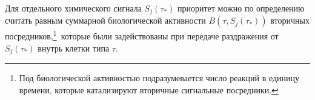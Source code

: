 


 







 Для отдельного химического сигнала $S_{j}(\tau_{*})$ приоритет можно по определению считать равным суммарной биологической активности $B(\tau, S_{j}(\tau_{*}))$ вторичных посредников,\footnote{Под биологической активностью подразумевается число реакций в единицу времени, которые  катализируют вторичные сигнальные посредники.}\!\!~которые были задействованы при передаче раздражения от $S_{j}(\tau_{*})$ внутрь клетки типа $\tau$.  








 






